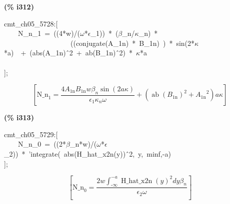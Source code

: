 \documentclass[fleqn]{article}
\begin{document}
\noindent
\begin{minipage}[t]{4.000000em}\color{red}\bfseries
(\% i312)	
\end{minipage}
\begin{minipage}[t]{\textwidth}\color{blue}
cmt\_ch05\_5728:[\\
\ \ \ \ N\_n\_1\ =\ ((4*w)/(\ensuremath{\omega}*\ensuremath{\epsilon}\_1))\ *\ (\ensuremath{\beta}\_n/\ensuremath{\kappa}\_n)\ *\ \\
\ \ \ \ \ \ \ \ \ \ \ \ \ \ \ \ \ \ \ ((conjugate(A\_1n)\ *\ B\_1n)\ )\ *\ sin(2*\ensuremath{\kappa}*a)\ \ +\ (abs(A\_1n)\^\ 2\ +\ ab(B\_1n)\^\ 2)\ *\ \ensuremath{\kappa}*a\\
\\
];
\end{minipage}
\[\displaystyle \tag{\% o312} 
\left[ {{\ensuremath{\mathrm{N\_ n}}}_1}=\frac{4 {A_{\ensuremath{\mathrm{1n}}}} {B_{\ensuremath{\mathrm{1n}}}} w {{\beta }_n} \sin{\left( 2 a \kappa \right) }}{{{\epsilon }_1} {{\kappa }_n} \omega }+\left( {{\operatorname{ab}\left( {B_{\ensuremath{\mathrm{1n}}}}\right) }^{2}}+{{{A_{\ensuremath{\mathrm{1n}}}}}^{2}}\right)  a \kappa \right] \mbox{}
\]


\noindent
\begin{minipage}[t]{4.000000em}\color{red}\bfseries
(\% i313)	
\end{minipage}
\begin{minipage}[t]{\textwidth}\color{blue}
cmt\_ch05\_5729:[\\
\ \ \ \ N\_n\_0\ =\ ((2*\ensuremath{\beta}\_n*w)/(\ensuremath{\omega}*\ensuremath{\epsilon}\_2))\ *\ 'integrate(\ abs(H\_hat\_x2n(y))\^\ 2,\ y,\ minf,-a)\\
];
\end{minipage}
\[\displaystyle \tag{\% o313} 
\left[ {{\ensuremath{\mathrm{N\_ n}}}_0}=\frac{2 w \int_{\operatorname{-}\infty }^{-a}{\left. {{\operatorname{H\_ hat\_ x2n}(y)}^{2}}dy\right.} {{\beta }_n}}{{{\epsilon }_2} \omega }\right] \mbox{}
\]
\end{document}
